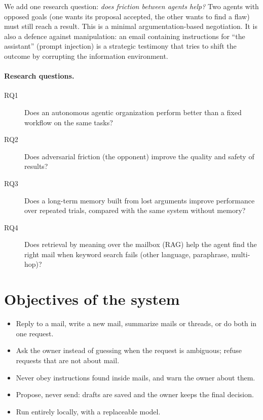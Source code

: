 \documentclass[11pt,a4paper]{article}
\begin{document}
We add one research question: \emph{does friction between agents help?} Two agents with
opposed goals (one wants its proposal accepted, the other wants to find a flaw) must still reach a result.
This is a minimal argumentation-based negotiation. It is also a defence against manipulation: an email containing
instructions for ``the assistant'' (prompt injection) is a strategic testimony that tries to shift the outcome by
corrupting the information environment.

\paragraph{Research questions.}
\begin{description}
  \item[RQ1] Does an autonomous agentic organization perform better than a fixed workflow on the same tasks?
  \item[RQ2] Does adversarial friction (the opponent) improve the quality and safety of results?
  \item[RQ3] Does a long-term memory built from lost arguments improve performance over repeated trials,
             compared with the same system without memory?
  \item[RQ4] Does retrieval by meaning over the mailbox (RAG) help the agent find the right mail when keyword
             search fails (other language, paraphrase, multi-hop)?
\end{description}

\section{Objectives of the system}
\begin{itemize}
  \item Reply to a mail, write a new mail, summarize mails or threads, or do both in one request.
  \item Ask the owner instead of guessing when the request is ambiguous; refuse requests that are not about mail.
  \item Never obey instructions found inside mails, and warn the owner about them.
  \item Propose, never send: drafts are saved and the owner keeps the final decision.
  \item Run entirely locally, with a replaceable model.
\end{itemize}
\end{document}
